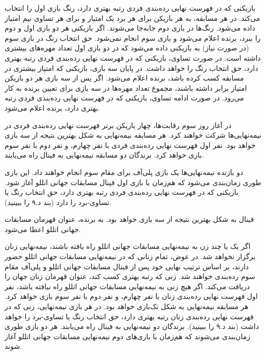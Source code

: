 


بازیکنی که در فهرست نهایی رده‌بندی فردی رتبه بهتری دارد، رنگ بازی اول را انتخاب می‌کند. در هر مسابقه، به هر بازیکن برای هر برد یک امتیاز و برای هر تساوی نیم امتیاز داده می‌شود. رنگ‌ها در بازی دوم جابه‌جا می‌شوند. اگر بازیکنی هر دو بازی اول و دوم را ببرد، برنده اعلام می‌شود و بازی سوم انجام نمی‌شود. حق انتخاب رنگ در بازی سوم (در صورت نیاز) به بازیکنی داده می‌شود که در دو بازی اول تعداد مهره‌های بیشتری داشته است. در صورت تساوی، بازیکنی که در فهرست نهایی رده‌بندی فردی رتبه بهتری دارد، حق انتخاب رنگ را خواهد داشت. در پایان سه بازی، بازیکنی که امتیاز بیشتری در مسابقه کسب کرده باشد، برنده اعلام می‌شود. اگر پس از سه بازی هر دو بازیکن امتیاز برابر داشته باشند، مجموع تعداد مهره‌ها در سه بازی برای تعیین برنده به کار می‌رود. در صورت ادامه تساوی، بازیکنی که در فهرست نهایی رده‌بندی فردی رتبه بهتری دارد، برنده اعلام می‌شود.



در آغاز روز سوم رقابت‌ها، چهار بازیکن برتر فهرست نهایی رده‌بندی فردی در نیمه‌نهایی‌ها شرکت خواهند کرد. هر مسابقه نیمه‌نهایی به شکل بهترین نتیجه از سه بازی خواهد بود. نفر اول فهرست نهایی رده‌بندی فردی با نفر چهارم، و نفر دوم با نفر سوم بازی خواهد کرد. برندگان دو مسابقه نیمه‌نهایی به فینال راه می‌یابند.


دو بازنده نیمه‌نهایی‌ها یک بازی پلی‌آف برای مقام سوم انجام خواهند داد. این بازی طوری زمان‌بندی می‌شود که هم‌زمان با بازی اول فینال مسابقات جهانی اتللو آغاز شود. بازیکنی که در فهرست نهایی رده‌بندی فردی رتبه بهتری دارد، حق انتخاب رنگ یا تساوی-برد را دارد (بند د.۹ را ببینید).


فینال به شکل بهترین نتیجه از سه بازی خواهد بود. به برنده، عنوان قهرمان مسابقات جهانی اتللو اعطا می‌شود.



اگر یک یا چند زن به نیمه‌نهایی مسابقات جهانی اتللو راه یافته باشند، نیمه‌نهایی زنان برگزار نخواهد شد. در عوض، تمام زنانی که در نیمه‌نهایی مسابقات جهانی اتللو حضور دارند، بر اساس ترتیب نهایی خود پس از فینال مسابقات جهانی اتللو و پلی‌آف مقام سوم رده‌بندی خواهند شد. زنی که رتبه بهتری کسب کند، عنوان قهرمان زنان جهان را دریافت می‌کند. اگر هیچ زنی به نیمه‌نهایی مسابقات جهانی اتللو راه نیافته باشد، نفر اول فهرست نهایی رده‌بندی زنان با نفر چهارم، و نفر دوم با نفر سوم بازی خواهد کرد. هر مسابقه نیمه‌نهایی به شکل تک‌بازی خواهد بود. در هر بازی نیمه‌نهایی، زنی که در فهرست نهایی رده‌بندی زنان رتبه بهتری دارد، حق انتخاب رنگ یا تساوی-برد را خواهد داشت (بند د.۹ را ببینید). برندگان دو نیمه‌نهایی به فینال راه می‌یابند. هر دو بازی طوری زمان‌بندی می‌شوند که هم‌زمان با بازی‌های دوم نیمه‌نهایی مسابقات جهانی اتللو آغاز شوند.

